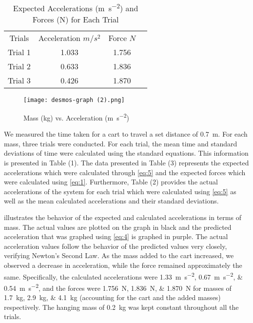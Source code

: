 \documentclass[reprint,amsmath,amssymb,aps]{revtex4-2}
\begin{document}
\begin{table} %
\centering
\begin{tabular}{cccc}
  Trials & Acceleration $m/s^2$ & Force $N$ \\ 
  Trial 1 & 1.033 & 1.756\\ 
  Trial 2 & 0.633 & 1.836 \\ 
  Trial 3 & 0.426 & 1.870 \\ 
\end{tabular}
\caption{ Expected Accelerations (\unit{\meter\per\second\squared}) and Forces (\unit{\newton}) for Each Trial}
\label{Accelerations for Each Trial} 
\end{table}

\begin{figure} %
\centering
\texttt{[image: desmos-graph (2).png]}
\caption{Mass (\unit{\kilo\gram}) vs. Acceleration (\unit{\meter\per\second\squared})}
\label{fig:graph of acceleration}
\end{figure}


We measured the time taken for a cart to travel a set distance of \qty{0.7}{\meter}. For each mass, three trials were conducted. For each trial, the mean time and standard deviations of time were calculated using the standard equations. This information is presented in Table (1). The data presented in Table (3) represents the expected accelerations which were calculated through  \cref{eq:5} and the expected forces which were calculated using \cref{eq:1}. Furthermore,  Table (2) provides the actual accelerations of the system for each trial which were calculated using \cref{eq:5} as well as the mean calculated accelerations and their standard deviations.

 illustrates the behavior of the expected and calculated accelerations in terms of mass. The actual values are plotted on the graph in black and the predicted acceleration that was graphed using \cref{eq:4} is graphed in purple. The actual acceleration values follow the behavior of the predicted values very closely, verifying Newton's Second Law. As the mass added to the cart increased, we observed a decrease in acceleration, while the force remained approximately the same. Specifically, the calculated accelerations were \qtylist{1.33;0.67;0.54}{\meter\per\second\squared}, and the forces were \qtylist{1.756;1.836;1.870}{\newton} for masses of \qtylist{1.7;2.9;4.1}{\kilo\gram} (accounting for the cart and the added masses) respectively. The hanging mass of \qty{0.2}{\kilo\gram} was kept constant throughout all the trials. 
\end{document}
